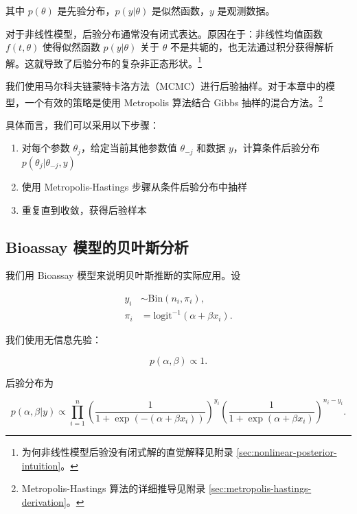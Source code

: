 其中 $p(\theta)$ 是先验分布，$p(y | \theta)$ 是似然函数，$y$ 是观测数据。

对于非线性模型，后验分布通常没有闭式表达。原因在于：非线性均值函数 $f(t, \theta)$ 使得似然函数 $p(y | \theta)$ 关于 $\theta$ 不是共轭的，也无法通过积分获得解析解。这就导致了后验分布的复杂非正态形状。\footnote{为何非线性模型后验没有闭式解的直觉解释见附录 \cref{sec:nonlinear-posterior-intuition}。}

我们使用马尔科夫链蒙特卡洛方法（MCMC）进行后验抽样。对于本章中的模型，一个有效的策略是使用 Metropolis 算法结合 Gibbs 抽样的混合方法。\footnote{Metropolis-Hastings 算法的详细推导见附录 \cref{sec:metropolis-hastings-derivation}。}

具体而言，我们可以采用以下步骤：

\begin{enumerate}
  \item 对每个参数 $\theta_j$，给定当前其他参数值 $\theta_{-j}$ 和数据 $y$，计算条件后验分布 $p(\theta_j | \theta_{-j}, y)$
  \item 使用 Metropolis-Hastings 步骤从条件后验分布中抽样
  \item 重复直到收敛，获得后验样本
\end{enumerate}

\subsection{Bioassay 模型的贝叶斯分析}\label{sec:bioassay-bayesian}

我们用 Bioassay 模型来说明贝叶斯推断的实际应用。设

\begin{align}
y_i &\sim \mathrm{Bin}(n_i, \pi_i), \label{eq:bioassay-likelihood} \\
\pi_i &= \mathrm{logit}^{-1}(\alpha + \beta x_i). \label{eq:bioassay-pi}
\end{align}

我们使用无信息先验：

\begin{equation}
p(\alpha, \beta) \propto 1. \label{eq:bioassay-prior}
\end{equation}

后验分布为

\begin{equation}
p(\alpha, \beta | y) \propto \prod_{i=1}^{n} \left(\frac{1}{1 + \exp(-(\alpha + \beta x_i))}\right)^{y_i} \left(\frac{1}{1 + \exp(\alpha + \beta x_i)}\right)^{n_i - y_i}. \label{eq:bioassay-posterior}
\end{equation}

